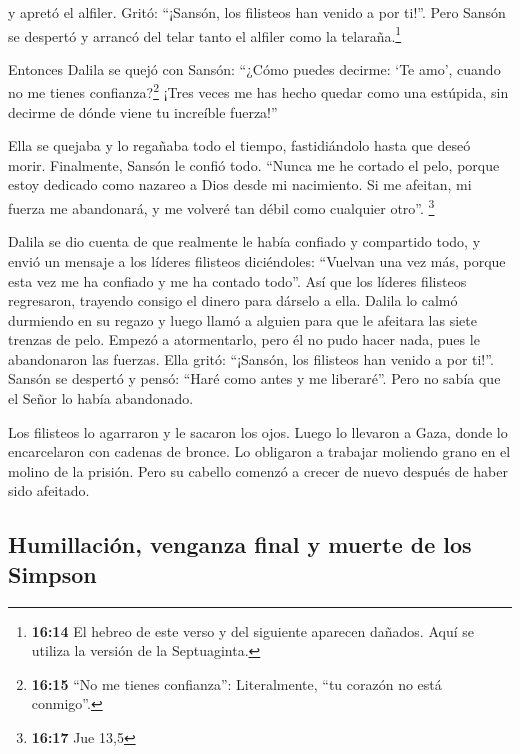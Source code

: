  y apretó el alfiler. Gritó: ``¡Sansón, los filisteos han
venido a por ti!''. Pero Sansón se despertó y arrancó del telar tanto el
alfiler como la telaraña.\footnote{\textbf{16:14} El hebreo de este
  verso y del siguiente aparecen dañados. Aquí se utiliza la versión de
  la Septuaginta.}

 Entonces Dalila se quejó con Sansón: ``¿Cómo puedes
decirme: `Te amo', cuando no me tienes confianza?\footnote{\textbf{16:15}
  ``No me tienes confianza'': Literalmente, ``tu corazón no está
  conmigo''.} ¡Tres veces me has hecho quedar como una estúpida, sin
decirme de dónde viene tu increíble fuerza!''

 Ella se quejaba y lo regañaba todo el tiempo,
fastidiándolo hasta que deseó morir.  Finalmente, Sansón
le confió todo. ``Nunca me he cortado el pelo, porque estoy dedicado
como nazareo a Dios desde mi nacimiento. Si me afeitan, mi fuerza me
abandonará, y me volveré tan débil como cualquier otro''. \footnote{\textbf{16:17}
  Jue 13,5}

 Dalila se dio cuenta de que realmente le había confiado
y compartido todo, y envió un mensaje a los líderes filisteos
diciéndoles: ``Vuelvan una vez más, porque esta vez me ha confiado y me
ha contado todo''. Así que los líderes filisteos regresaron, trayendo
consigo el dinero para dárselo a ella.  Dalila lo calmó
durmiendo en su regazo y luego llamó a alguien para que le afeitara las
siete trenzas de pelo. Empezó a atormentarlo, pero él no pudo hacer
nada, pues le abandonaron las fuerzas.  Ella gritó:
``¡Sansón, los filisteos han venido a por ti!''. Sansón se despertó y
pensó: ``Haré como antes y me liberaré''. Pero no sabía que el Señor lo
había abandonado.

 Los filisteos lo agarraron y le sacaron los ojos. Luego
lo llevaron a Gaza, donde lo encarcelaron con cadenas de bronce. Lo
obligaron a trabajar moliendo grano en el molino de la prisión.
 Pero su cabello comenzó a crecer de nuevo después de
haber sido afeitado.

\hypertarget{humillaciuxf3n-venganza-final-y-muerte-de-los-simpson}{%
\subsection{Humillación, venganza final y muerte de los
Simpson}\label{humillaciuxf3n-venganza-final-y-muerte-de-los-simpson}}

